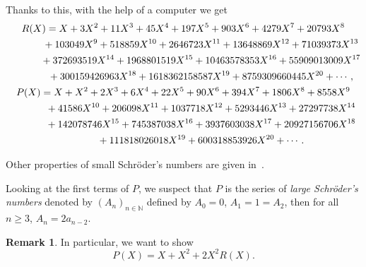 \documentclass[10pt,a4paper]{amsart}
\numberwithin{equation}{section}
\theoremstyle{definition}
\newtheorem{Rq}[defi]{Remark}
\theoremstyle{plain}
\newcommand{\N}{\mathbb{N}}
\begin{document}
Thanks to this, with the help of a computer we get
\begin{gather*}
	R(X)=X+3X^2+11X^3+45X^4+197X^5+903X^6+4279X^7+20793 {{X}^{8}} \\
\hphantom{R(X)=}{} +103049 {{X}^{9}}+518859 {{X}^{10}} +2646723 {{X}^{11}}+13648869 {{X}^{12}}+71039373 {{X}^{13}} \\
\hphantom{R(X)=}{} +372693519 {{X}^{14}}+1968801519 {{X}^{15}}+10463578353 {{X}^{16}}+55909013009 {{X}^{17}} \\
\hphantom{R(X)=}{} +300159426963 {{X}^{18}}+1618362158587 {{X}^{19}}+8759309660445 {{X}^{20}}+\cdots, \\
	P(X)=X+{{X}^{2}}+2 {{X}^{3}}+6 {{X}^{4}}+22 {{X}^{5}}+90 {{X}^{6}}+394 {{X}^{7}}+1806 {{X}^{8}}+8558 {{X}^{9}}\\
\hphantom{P(X)=}{} +41586 {{X}^{10}}+206098 {{X}^{11}}+1037718 {{X}^{12}}+5293446 {{X}^{13}}+27297738 {{X}^{14}} \\
\hphantom{P(X)=}{} +142078746 {{X}^{15}} +745387038 {{X}^{16}}+3937603038 {{X}^{17}}+20927156706 {{X}^{18}}\\
\hphantom{P(X)=}{} +111818026018 {{X}^{19}}+600318853926 {{X}^{20}}+\cdots.
\end{gather*}

Other properties of small Schr\"oder's numbers are given in~\cite{OEIS}.

Looking at the first terms of $P$, we suspect that $P$ is the series of \emph{large Schr\"oder's numbers} denoted by $(A_n)_{n\in\N}$ defined by $A_0=0$, $A_1=1=A_2$, then for all $n\geq 3$, $A_{n}=2a_{n-2}$.

\begin{Rq}\label{Rq:series}
	In particular, we want to show
	\[
	P(X)=X+X^2+2X^2R(X).
	\]
\end{Rq}
\end{document}
